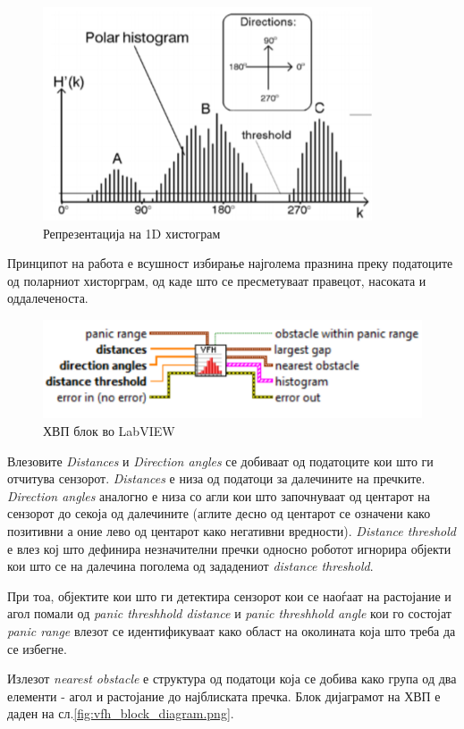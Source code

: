 \documentclass[12pt]{article}
\begin{document}
  \begin{figure}[H]
    \centering
    \includegraphics[width=0.35\linewidth]{./images/1d_his.png}
    \caption{Репрезентација на 1D хистограм}
    \label{fig:1d_his.png}
    \end{figure}

  Принципот на работа е всушност избирање најголема празнина преку податоците од поларниот хисторграм, од каде што се пресметуваат правецот, насоката и оддалеченоста.

  \begin{figure}[H]
    \centering
    \includegraphics[width=0.5\linewidth]{./images/vfh_lv.png}
    \caption{ХВП блок во LabVIEW}
    \label{fig:vfh_lv.png}
    \end{figure}

  Влезовите \textit{Distances} и \textit{Direction angles} се добиваат од податоците кои што ги отчитува сензорот. \textit{Distances} е низа од податоци за далечините на пречките. \textit{Direction angles} аналогно е низа со агли кои што започнуваат од центарот на сензорот до секоја од далечините (аглите десно од центарот се означени како позитивни а оние лево од центарот како негативни вредности). \textit{Distance threshold} е влез кој што дефинира незначителни пречки односно роботот игнорира објекти кои што се на далечина поголема од зададениот \textit{distance threshold}.

  При тоа, објектите кои што ги детектира сензорот кои се наоѓаат на растојание и агол помали од \textit{panic threshhold distance} и \textit{panic threshhold angle} кои го состојат \textit{panic range} влезот се идентификуваат како област на околината која што треба да се избегне.

  Излезот \textit{nearest obstacle} е структура од податоци која се добива како група од два елементи - агол и растојание до најблиската пречка. Блок дијаграмот на ХВП е даден на сл.\ref{fig:vfh_block_diagram.png}.
\end{document}
